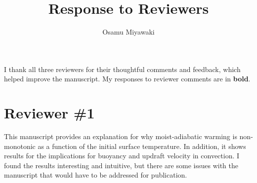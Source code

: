 \documentclass{article}
\title{Response to Reviewers}
\author{Osamu Miyawaki}
\begin{document}
\maketitle

I thank all three reviewers for their thoughtful comments and feedback, which helped improve the manuscript. My responses to reviewer comments are in \textbf{bold}.

\section{Reviewer \#1}

This manuscript provides an explanation for why moist-adiabatic warming is non-monotonic as a function of the initial surface temperature. In addition, it shows results for the implications for buoyancy and updraft velocity in convection. I found the results interesting and intuitive, but there are some issues with the manuscript that would have to be addressed for publication.
\end{document}
